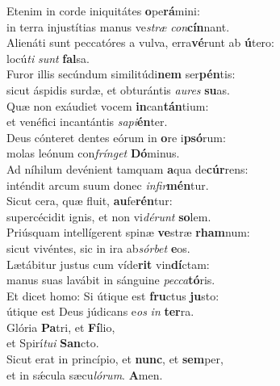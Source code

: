 \evenverse Etenim in corde iniquitátes \textbf{o}pe\textbf{rá}mini:~\*\\
\evenverse in terra injustítias manus ve\textit{stræ} \textit{con}\textbf{cín}nant.\\
\oddverse Alienáti sunt peccatóres a vulva, erra\textbf{vé}runt ab \textbf{ú}tero:~\*\\
\oddverse locú\textit{ti} \textit{sunt} \textbf{fal}sa.\\
\evenverse Furor illis secúndum similitúdi\textbf{nem} ser\textbf{pén}tis:~\*\\
\evenverse sicut áspidis surdæ, et obturántis \textit{au}\textit{res} \textbf{su}as.\\
\oddverse Quæ non exáudiet vocem \textbf{in}can\textbf{tán}tium:~\*\\
\oddverse et venéfici incantántis \textit{sa}\textit{pi}\textbf{én}ter.\\
\evenverse Deus cónteret dentes eórum in \textbf{o}re i\textbf{psó}rum:~\*\\
\evenverse molas leónum con\textit{frín}\textit{get} \textbf{Dó}minus.\\
\oddverse Ad níhilum devénient tamquam \textbf{a}qua de\textbf{cúr}rens:~\*\\
\oddverse inténdit arcum suum donec \textit{in}\textit{fir}\textbf{mén}tur.\\
\evenverse Sicut cera, quæ fluit, \textbf{au}fe\textbf{rén}tur:~\*\\
\evenverse supercécidit ignis, et non vi\textit{dé}\textit{runt} \textbf{so}lem.\\
\oddverse Priúsquam intellígerent spinæ \textbf{ve}stræ \textbf{rham}num:~\*\\
\oddverse sicut vivéntes, sic in ira ab\textit{sór}\textit{bet} \textbf{e}os.\\
\evenverse Lætábitur justus cum víde\textbf{rit} vin\textbf{dí}ctam:~\*\\
\evenverse manus suas lavábit in sánguine \textit{pec}\textit{ca}\textbf{tó}ris.\\
\oddverse Et dicet homo: Si útique est \textbf{fru}ctus \textbf{ju}sto:~\*\\
\oddverse útique est Deus júdicans e\textit{os} \textit{in} \textbf{ter}ra.\\
\evenverse Glória \textbf{Pa}tri, et \textbf{Fí}lio,~\*\\
\evenverse et Spirí\textit{tu}\textit{i} \textbf{San}cto.\\
\oddverse Sicut erat in princípio, et \textbf{nunc}, et \textbf{sem}per,~\*\\
\oddverse et in sǽcula sæcu\textit{ló}\textit{rum}. \textbf{A}men.\\
